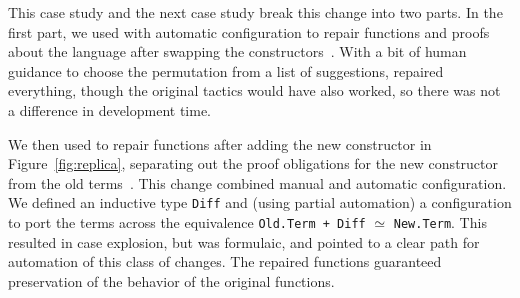 This case study and the next case study break this change into two parts.
In the first part, we used \toolname with automatic configuration to repair functions and proofs about the language
after swapping the constructors~\href{https://github.com/uwplse/pumpkin-pi/blob/v2.0.0/plugin/coq/Swap.v}{}.
With a bit of human guidance to choose the permutation from a list of suggestions,
\toolname repaired everything,
though the original tactics would have also worked,
so there was not a difference in development time.

We then used \toolname to repair functions 
after adding the new constructor in Figure~\ref{fig:replica}, separating out the proof obligations for the new constructor from the old terms~\href{https://github.com/uwplse/pumpkin-pi/blob/v2.0.0/plugin/coq/playground/add_constr.v}{}.
This change combined manual and automatic configuration.
We defined an inductive type \lstinline{Diff} and (using partial automation) a configuration to port the terms across the equivalence \lstinline{Old.Term + Diff} $\simeq$ \lstinline{New.Term}.
This resulted in case explosion, but was formulaic, and pointed to a clear path for automation of this class of changes.
The repaired functions guaranteed preservation of the behavior of the original functions. %

